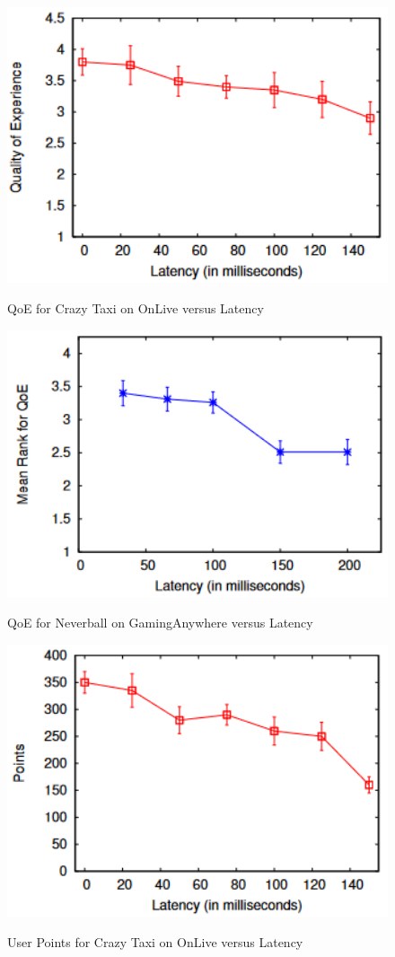 \begin{figure}[H]
	\centering
	\includegraphics[width=12cm]{../img/fig20.png}
	\caption{QoE for Crazy Taxi on OnLive versus Latency}
	\parencite[Section 4, Figure 4]{claypool2014effects}
\end{figure}
\begin{figure}[H]
	\centering
	\includegraphics[width=12cm]{../img/fig21.png}
	\caption{QoE for Neverball on GamingAnywhere versus Latency}
	\parencite[Section 4, Figure 5]{claypool2014effects}
\end{figure}
\begin{figure}[H]
	\centering
	\includegraphics[width=12cm]{../img/fig22.png}
	\caption{User Points for Crazy Taxi on OnLive versus Latency}
	\parencite[Section 4, Figure 6]{claypool2014effects}
\end{figure}
